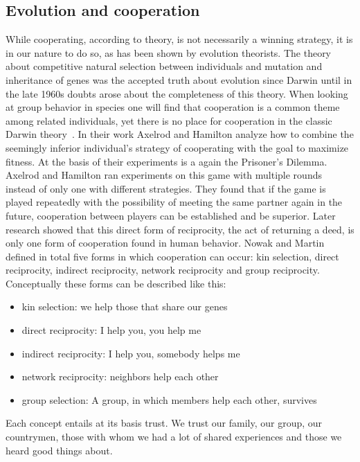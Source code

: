 \subsection{Evolution and cooperation}
While cooperating, according to theory, is not necessarily a winning strategy, it is in our nature 
to do so, as has been shown by evolution theorists. The theory about competitive natural selection 
between individuals and mutation and inheritance of genes was the accepted truth about evolution 
since Darwin until in the late 1960s doubts arose about the completeness of this 
theory. When looking at group behavior in species one will find that cooperation is a common theme
among related individuals, yet there is no place for cooperation in the classic Darwin 
theory~\cite{Axelrod1390}. In their work Axelrod and Hamilton \cite{Axelrod1390} 
analyze how to combine the seemingly inferior individual's strategy of cooperating with the goal to 
maximize fitness. At the basis of their experiments is a again the Prisoner's 
Dilemma. Axelrod and Hamilton ran experiments on this game with multiple rounds instead of only one with
different strategies. They found that if the game is played repeatedly with the possibility of 
meeting the same partner again in the future, cooperation between players can be established and be
superior. Later research showed that this direct form of reciprocity, the act of returning a deed,
is only one form of cooperation found in human behavior. Nowak and 
Martin~\cite{nowak2006five} defined in total five forms in which cooperation can occur: kin selection, direct
reciprocity, indirect reciprocity, network reciprocity and group reciprocity. Conceptually these 
forms can be described like this:

\begin{itemize}
    \item kin selection: we help those that share our genes
    \item direct reciprocity: I help you, you help me
    \item indirect reciprocity: I help you, somebody helps me
    \item network reciprocity: neighbors help each other
    \item group selection: A group, in which members help each other, survives
\end{itemize}

Each concept entails at its basis trust. We trust our family, our group, our countrymen, those with whom we had a lot
of shared experiences and those we heard good things about. 

